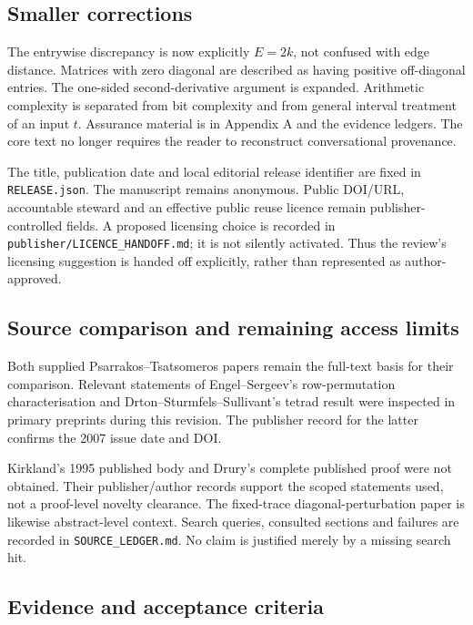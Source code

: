 \documentclass[
  11pt,
  a4paper,
]{article}
\begin{document}
\subsection{Smaller corrections}\label{smaller-corrections}

The entrywise discrepancy is now explicitly \(E=2k\), not confused with
edge distance. Matrices with zero diagonal are described as having
positive off-diagonal entries. The one-sided second-derivative argument
is expanded. Arithmetic complexity is separated from bit complexity and
from general interval treatment of an input \(t\). Assurance material is
in Appendix A and the evidence ledgers. The core text no longer requires
the reader to reconstruct conversational provenance.

The title, publication date and local editorial release identifier are
fixed in \texttt{RELEASE.json}. The manuscript remains anonymous. Public
DOI/URL, accountable steward and an effective public reuse licence
remain publisher-controlled fields. A proposed licensing choice is
recorded in \texttt{publisher/LICENCE\_HANDOFF.md}; it is not silently
activated. Thus the review's licensing suggestion is handed off
explicitly, rather than represented as author-approved.

\subsection{Source comparison and remaining access
limits}\label{source-comparison-and-remaining-access-limits}

Both supplied Psarrakos--Tsatsomeros papers remain the full-text basis
for their comparison. Relevant statements of Engel--Sergeev's
row-permutation characterisation and Drton--Sturmfels--Sullivant's
tetrad result were inspected in primary preprints during this revision.
The publisher record for the latter confirms the 2007 issue date and
DOI.

Kirkland's 1995 published body and Drury's complete published proof were
not obtained. Their publisher/author records support the scoped
statements used, not a proof-level novelty clearance. The fixed-trace
diagonal-perturbation paper is likewise abstract-level context. Search
queries, consulted sections and failures are recorded in
\texttt{SOURCE\_LEDGER.md}. No claim is justified merely by a missing
search hit.

\subsection{Evidence and acceptance
criteria}\label{evidence-and-acceptance-criteria}
\end{document}
